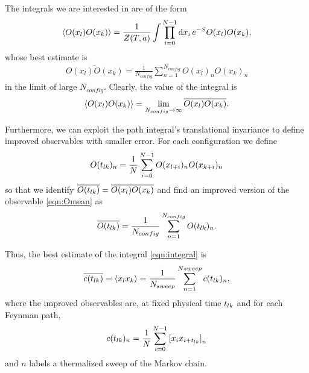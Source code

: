 The integrals we are interested in are of the form
\begin{align}
  \label{eqn:form}
  \ev{O(x_{l})O(x_{k})} = \frac{1}{Z(T,a)}\int \prod_{i=0}^{N-1}\dd{x_{i}}e^{-S}O(x_{l})O({x_{k}}),
\end{align}
whose best estimate is
\begin{align}
  \label{eqn:Omean}
  \overline{O(x_{l})O(x_{k})} = \frac{1}{N_{config}}\sum_{n=1}^{N_{config}}O(x_{l})_{n}O(x_{k})_{n}
\end{align}
in the limit of large $N_{config}$. Clearly, the value of the integral is
\begin{align}
   \ev{O(x_{l})O(x_{k})} = \lim_{N_{config}\to\infty}  \overline{O(x_{l})O(x_{k})}.
\end{align}

Furthermore, we can exploit the path integral's translational invariance to define improved observables with
smaller error. For each configuration we define
\begin{align}
  \label{eqn:Oimproved}
  O(t_{lk})_{n} = \frac{1}{N}\sum_{i=0}^{N-1}O(x_{l+i})_{n}O(x_{k+i})_{n}
\end{align}
so that we identify $\overline{O(t_{lk})}=\overline{O(x_{l})O(x_{k})}$ and find an improved version of the
observable \ref{eqn:Omean} as
\begin{align}
  \overline{O(t_{lk})} = \frac{1}{N_{config}}\sum_{n=1}^{N_{config}}O(t_{lk})_{n}.
\end{align}

Thus, the best estimate of the integral \ref{eqn:integral} is
\begin{align}
  \overline{\ct} = \ev{x_{l}x_{k}} = \frac{1}{N_{sweep}}\sum_{n=1}^{Nsweep}\ct_{n},
\end{align}
where the improved observables are, at fixed physical time $t_{lk}$ and for each Feynman path,
\begin{align}
  c(t_{lk})_{n} = \frac{1}{N}\sum_{i=0}^{N-1}\qty[x_{i}x_{i+t_{lk}}]_{n}
\end{align}
and $n$ labels a thermalized sweep of the Markov chain.
